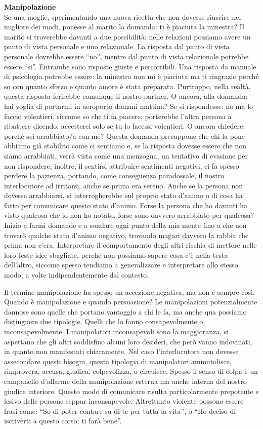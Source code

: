 \documentclass[12pt]{book} %
\begin{document}
\noindent \textbf{\large Manipolazione} \\
Se una moglie, sperimentando una nuova ricetta che non dovesse riuscire nel migliore dei modi,
ponesse al marito la domanda: ti è piaciuta la minestra? Il marito si troverebbe davanti a due possibilità: nelle
relazioni possiamo avere un punto di vista personale e uno relazionale. La risposta dal punto di vista personale
dovrebbe essere “no”, mentre dal punto di vista relazionale potrebbe essere “si”. Entrambe sono risposte giuste e
percorribili. Una risposta da manuale di psicologia potrebbe essere: la minestra non mi è piaciuta ma ti ringrazio
perché so con quanto sforzo e quanto amore è stata preparata. Purtroppo, nella realtà, questa risposta ferirebbe
comunque il nostro partner. O ancora, alla domanda: hai voglia di portarmi in aeroporto domani mattina? Se si
rispondesse: no ma lo faccio volentieri, siccome so che ti fa piacere; porterebbe l'altra persona a ribattere dicendo:
accetterei solo se tu lo facessi volentieri. O ancora chiedere: perché sei arrabbiato/a con me? Questa domanda
presuppone che chi la pone abbiamo già stabilito come ci sentiamo e, se la risposta dovesse essere che non siamo
arrabbiati, verrà vista come una menzogna, un tentativo di evasione per non rispondere, inoltre, il sentirsi attribuire
sentimenti negativi, ci fa spesso perdere la pazienza, portando, come conseguenza paradossale, il nostro
interlocutore ad irritarsi, anche se prima era sereno. Anche se la persona non dovesse arrabbiarsi, si interrogherebbe
sul proprio stato d'animo o di cosa ha fatto per comunicare questo stato d'animo. 
Forse la persona che ho davanti ha visto qualcosa che io non ho notato,
forse sono davvero arrabbiato per qualcosa? Inizio a farmi domande e a sondare ogni punto della mia mente fino a che
non troverò qualche stato d'animo negativo, trovando magari davvero la rabbia che prima non
c'era. Interpretare il comportamento degli altri rischia di mettere nelle loro teste idee
sbagliate, perché non possiamo sapere cosa c'è nella testa dell'altro, siccome spesso tendiamo a generalizzare e
interpretare allo stesso modo, a volte indipendentemente dal contesto. 

Il termine manipolazione ha spesso un accezione negativa, ma non è sempre così. Quando è manipolazione e quando persuasione?
Le manipolazioni potenzialmente dannose sono quelle che portano vantaggio a
chi le fa, ma anche qua possiamo distinguere due tipologie. Quelli che lo fanno consapevolmente o inconsapevolmente.
I manipolatori inconsapevoli sono la maggioranza, si aspettano che gli altri soddisfino alcuni loro desideri, che però
vanno indovinati, in quanto non manifestati chiaramente. Nel caso l'interlocutore non dovesse
assecondare questi bisogni, questa tipologia di manipolatori ammutolisce, rimprovera, accusa, giudica, colpevolizza,
o circuisce. Spesso il senso di colpa è un campanello d'allarme della manipolazione esterna ma
anche interna del nostro giudice interiore. Questo modo di comunicare risulta particolarmente prepotente e lesivo delle
persone seppur inconsapevole. Altrettanto violente possono essere frasi come: “So di poter contare su di te per tutta
la vita”, o “Ho deciso di iscriverti a questo corso; ti farà bene”. 
\end{document}

